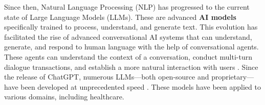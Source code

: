 \noindent Since then, Natural Language Processing (NLP) has progressed to the current state of Large Language Models (LLMs). These are advanced \textcolor{TUMRed}{\textbf{AI models}} specifically trained to process, understand, and generate text. This evolution has facilitated the rise of advanced conversational AI systems that can understand, generate, and respond to human language with the help of conversational agents. These agents can understand the context of a conversation, conduct multi-turn dialogue transactions, and establish a more natural interaction with users \cite{clark2019makes}. Since the release of ChatGPT, numerous LLMs---both open-source and proprietary---have been developed at unprecedented speed \cite{clusmann2023future}. These models have been applied to various domains, including healthcare.


